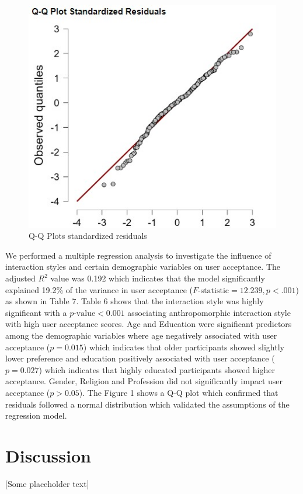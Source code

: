 \documentclass[conference]{IEEEtran}
\begin{document}
\begin{figure}[h]
    \includegraphics[width=\linewidth]{images/Q-Q Plots for residuals.jpg}
    \caption{Q-Q Plots standardized residuals}
    \label{q_qplots}    
  \end{figure}

  We performed a multiple regression analysis to investigate the influence of interaction styles and certain demographic variables on user acceptance. The adjusted \( R^2 \) value was 0.192 which indicates that the model significantly explained 19.2\% of the variance in user acceptance (\( F\text{-statistic} = 12.239, p < .001 \)) as shown in Table 7. Table 6 shows that the interaction style was highly significant with a \( p\text{-value} < 0.001 \) associating anthropomorphic interaction style with high user acceptance scores. Age and Education were significant predictors among the demographic variables where age negatively associated with user acceptance (\( p = 0.015 \)) which indicates that older participants showed slightly lower preference and education positively associated with user acceptance (\( p = 0.027 \)) which indicates that highly educated participants showed higher acceptance. Gender, Religion and Profession did not significantly impact user acceptance (\( p > 0.05 \)). The Figure 1 shows a Q-Q plot which confirmed that residuals followed a normal distribution which validated the assumptions of the regression model.
  \section{Discussion}
 [Some placeholder text]
\end{document}
